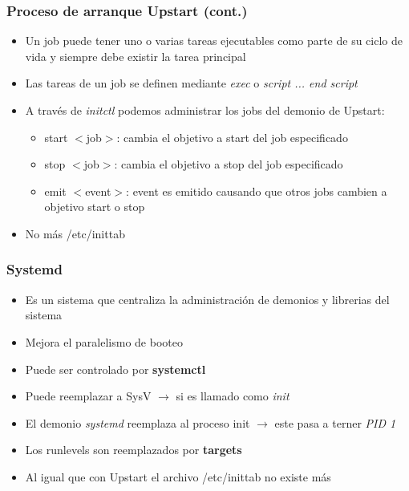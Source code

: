 \begin{frame}
  	\frametitle{Proceso de arranque \textbf{Upstart} (cont.)}
  	\begin{itemize}
		\item Un job puede tener uno o varias tareas ejecutables como parte de su ciclo de vida y siempre debe existir la tarea principal
	  	\item Las tareas de un job se definen mediante \textit{exec} o \textit{script ... end script}
	  	\item A través de \textit{initctl} podemos administrar los jobs del demonio de Upstart:
	  	\begin{itemize}
	  		\item start $<$job$>$: cambia el objetivo a start del job especificado
	  		\item stop $<$job$>$: cambia el objetivo a stop del job especificado
	  		\item emit $<$event$>$: event es emitido causando que otros jobs cambien a objetivo start o stop
	  	\end{itemize}
	  	\item No más /etc/inittab
  	\end{itemize}
\end{frame}

\begin{frame}
  	\frametitle{\textbf{Systemd}}
  	\begin{itemize}
		\item Es un sistema que centraliza la administración de demonios y librerias del sistema
		\item Mejora el paralelismo de booteo
		\item Puede ser controlado por \textbf{systemctl}
		\item Puede reemplazar a SysV $\rightarrow$ si es llamado como \emph{init}
		\item El demonio \emph{systemd} reemplaza al proceso init $\rightarrow$ este pasa a terner \emph{PID 1}
		\item Los runlevels son reemplazados por \textbf{targets}
		\item Al igual que con Upstart el archivo /etc/inittab no existe más
  	\end{itemize}
\end{frame}

